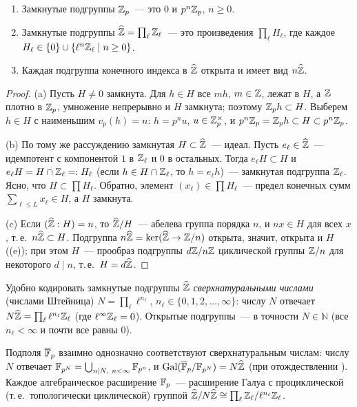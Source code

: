 \begin{proposition}[7.34]
\begin{enumerate}[label=\textup{(\alph*)}]
\item Замкнутые подгруппы $\mathbb Z_p$~--- это $0$ и $p^n\mathbb Z_p$, $n\ge0$.
\item Замкнутые подгруппы $\widehat{\mathbb Z}=\prod_\ell\mathbb Z_\ell$~--- это произведения $\prod_\ell H_\ell$, где каждое
$H_\ell\in\{0\}\cup\{\ell^n\mathbb Z_\ell\mid n\ge0\}$.
\item Каждая подгруппа конечного индекса в $\widehat{\mathbb Z}$ открыта и имеет вид $n\widehat{\mathbb Z}$.
\end{enumerate}
\end{proposition}

\begin{proof}
(a) Пусть $H\ne0$ замкнута. Для $h\in H$ все $mh$, $m\in\mathbb Z$, лежат в $H$, а $\mathbb Z$ плотно в $\mathbb Z_p$, умножение непрерывно и
$H$ замкнута; поэтому $\mathbb Z_p h\subset H$. Выберем $h\in H$ с наименьшим $v_p(h)=n$: $h=p^nu$, $u\in\mathbb Z_p^\times$, и
$p^n\mathbb Z_p=\mathbb Z_p h\subset H\subset p^n\mathbb Z_p$.

(b) По тому же рассуждению замкнутая $H\subset\widehat{\mathbb Z}$~--- идеал. Пусть $e_\ell\in\widehat{\mathbb Z}$~--- идемпотент с компонентой $1$ в
$\mathbb Z_\ell$ и $0$ в остальных. Тогда $e_\ell H\subset H$ и $e_\ell H=H\cap\mathbb Z_\ell=:H_\ell$ (если $h\in H\cap\mathbb Z_\ell$, то
$h=e_\ell h$)~--- замкнутая подгруппа $\mathbb Z_\ell$. Ясно, что $H\subset\prod H_\ell$. Обратно, элемент $(x_\ell)\in\prod
H_\ell$~--- предел конечных сумм $\sum_{\ell\le L}x_\ell\in H$, а $H$ замкнута.

(c) Если $(\widehat{\mathbb Z}:H)=n$, то $\widehat{\mathbb Z}/H$~--- абелева группа порядка $n$, и $nx\in H$ для всех $x$, т.\,е.\ $n\widehat{\mathbb Z}\subset H$. Подгруппа
$n\widehat{\mathbb Z}=\ker(\widehat{\mathbb Z}\to\mathbb Z/n)$ открыта, значит, открыта и $H$ ((e)); при этом $H$~--- прообраз подгруппы $d\mathbb Z/n\mathbb Z$
циклической группы $\mathbb Z/n$ для некоторого $d\mid n$, т.\,е.\ $H=d\widehat{\mathbb Z}$.
\end{proof}

Удобно кодировать замкнутые подгруппы $\widehat{\mathbb Z}$ \emph{сверхнатуральными числами} (числами Штейница)
$N=\prod_\ell\ell^{n_\ell}$, $n_\ell\in\{0,1,2,\dots,\infty\}$: числу $N$ отвечает $N\widehat{\mathbb Z}=\prod_\ell\ell^{n_\ell}\mathbb Z_\ell$
(где $\ell^\infty\mathbb Z_\ell=0$). Открытые подгруппы~--- в точности $N\in\mathbb N$ (все $n_\ell<\infty$ и почти все равны $0$).

\begin{corollary}[7.34a]
Подполя $\overline{\mathbb F}_p$ взаимно однозначно соответствуют сверхнатуральным числам: числу $N$ отвечает
$\F_{p^N}=\bigcup_{n\mid N,\ n<\infty}\F_{p^n}$, и $\operatorname{Gal}(\overline{\mathbb F}_p/\mathbb F_{p^N})=N\widehat{\mathbb Z}$ (при отождествлении ). Каждое
алгебраическое расширение $\mathbb F_p$~--- расширение Галуа с проциклической (т.\,е.\ топологически циклической) группой $\widehat{\mathbb Z}/N\widehat{\mathbb Z}\cong\prod_\ell\mathbb Z_\ell/\ell^{n_\ell}\mathbb Z_\ell$.
\end{corollary}

